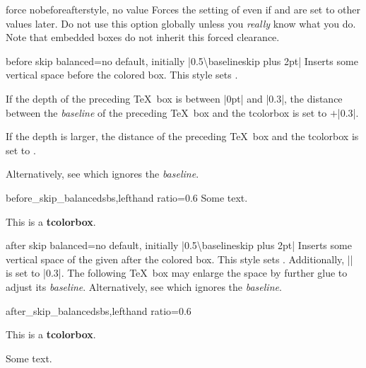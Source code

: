 \begin{docTcbKey}{force nobeforeafter}{}{style, no value}
  Forces the setting of  even if
   and  are set to other values
  later. Do not use this option globally unless you \emph{really} know what you do.
  Note that embedded boxes do not inherit this forced clearance.
\end{docTcbKey}


\clearpage

\begin{docTcbKey}[][doc new={2020-09-25}]{before skip balanced}{=}{no default, initially |0.5\textbackslash baselineskip plus 2pt|}
  Inserts some vertical space before the colored box. This style sets .\par
  If the depth of the
  preceding \TeX\ box is between |0pt| and |0.3\baselineskip|,
  the distance between the \emph{baseline} of the preceding \TeX\ box and the tcolorbox
  is set to $+$|0.3\baselineskip|.\par
  If the depth is larger, the distance of the preceding \TeX\ box and the tcolorbox
  is set to .\par
  Alternatively, see  which ignores the \emph{baseline}.

\begin{exdispExample*}{before_skip_balanced}{sbs,lefthand ratio=0.6}
Some text.
\begin{tcolorbox}[before skip balanced=1cm,
    colframe=red!50!white]
  This is a \textbf{tcolorbox}.
\end{tcolorbox}
\end{exdispExample*}
\end{docTcbKey}

\begin{docTcbKey}[][doc new={2020-09-25}]{after skip balanced}{=}{no default, initially |0.5\textbackslash baselineskip plus 2pt|}
  Inserts some vertical space of the given  after the colored box.
  This style sets .
  Additionally, |\prevdepth| is set to |0.3\baselineskip|. The following
  \TeX\ box may enlarge the space by further glue to adjust its \emph{baseline}.
  Alternatively, see  which ignores the \emph{baseline}.

\begin{exdispExample*}{after_skip_balanced}{sbs,lefthand ratio=0.6}
\begin{tcolorbox}[after skip balanced=1cm,
    colframe=red!50!white]
  This is a \textbf{tcolorbox}.
\end{tcolorbox}
Some text.
\end{exdispExample*}
\end{docTcbKey}


